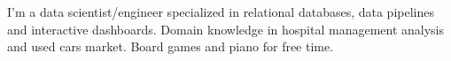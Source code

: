

\begin{cvparagraph}
\begin{minipage}[t]{0.3\textwidth} %
I'm a data scientist/engineer specialized in relational databases, data pipelines
and interactive dashboards. Domain knowledge in hospital management analysis and
used cars market. Board games and piano for free time.
\end{minipage}
\hfill
\begin{minipage}[t]{0.6\textwidth} %

\end{minipage}
\end{cvparagraph}
